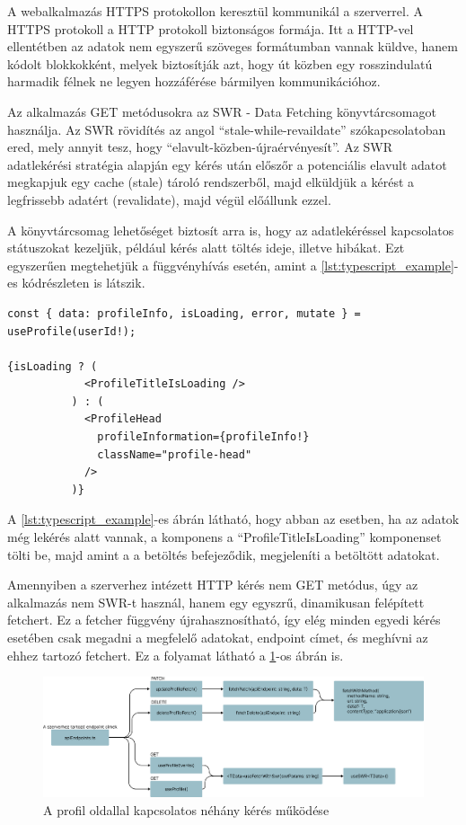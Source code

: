 A webalkalmazás HTTPS protokollon keresztül kommunikál a szerverrel. A HTTPS protokoll a HTTP protokoll biztonságos formája. Itt a HTTP-vel ellentétben az adatok nem egyszerű szöveges formátumban vannak küldve, hanem kódolt blokkokként, melyek biztosítják azt, hogy út közben egy rosszindulatú harmadik félnek ne legyen hozzáférése bármilyen kommunikációhoz.

Az alkalmazás GET metódusokra az SWR - Data Fetching könyvtárcsomagot használja. Az SWR rövidítés az angol ``stale-while-revaildate'' szókapcsolatoban ered, mely annyit tesz, hogy ``elavult-közben-újraérvényesít''. Az SWR adatlekérési stratégia alapján egy kérés után előszőr a potenciális elavult adatot megkapjuk egy cache (stale) tároló rendszerből, majd elküldjük a kérést a legfrissebb adatért (revalidate), majd végül előállunk ezzel.

A könyvtárcsomag lehetőséget biztosít arra is, hogy az adatlekéréssel kapcsolatos státuszokat kezeljük, például kérés alatt töltés ideje, illetve hibákat. Ezt egyszerűen megtehetjük a függvényhívás esetén, amint a \ref{lst:typescript_example}-es kódrészleten is látszik.

\newpage

\begin{lstlisting}[caption={SWR használata profil adatok lekérésére}, label={lst:typescript_example}]
const { data: profileInfo, isLoading, error, mutate } = useProfile(userId!);

{isLoading ? (
            <ProfileTitleIsLoading />
          ) : (
            <ProfileHead
              profileInformation={profileInfo!}
              className="profile-head"
            />
          )}
\end{lstlisting}

A \ref{lst:typescript_example}-es ábrán látható, hogy abban az esetben, ha az adatok még lekérés alatt vannak, a komponens a ``ProfileTitleIsLoading'' komponenset tölti be, majd amint a a betöltés befejeződik, megjeleníti a betöltött adatokat.

Amennyiben a szerverhez intézett HTTP kérés nem GET metódus, úgy az alkalmazás nem SWR-t használ, hanem egy egyszrű, dinamikusan felépített fetchert. Ez a fetcher függvény újrahasznosítható, így elég minden egyedi kérés esetében csak megadni a megfelelő adatokat, endpoint címet, és meghívni az ehhez tartozó fetchert. Ez a folyamat látható a \ref{fig:fetching_data_example}-os ábrán is.

\begin{figure}[h]
    \centering
    \includegraphics[width=\textwidth]{./images/fetchingData.png}
    \caption{A profil oldallal kapcsolatos néhány kérés működése}
    \label{fig:fetching_data_example}
\end{figure}

